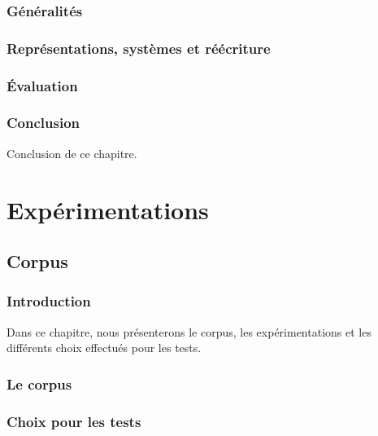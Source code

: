 \documentclass[a4paper,11pt,twoside]{memoir}
\begin{document}
\section{Généralités}


\section{Représentations, systèmes et réécriture}

\newpage



\section{Évaluation}


\section{Conclusion}
Conclusion de ce chapitre.



\part{Expérimentations}



\chapter{Corpus}
\label{chap:corpus}
\minitoc

\section{Introduction}
Dans ce chapitre, nous présenterons le corpus, les expérimentations et les différents choix effectués pour les tests.

\section{Le corpus}

\section{Choix pour les tests}

\newpage

\end{document}
